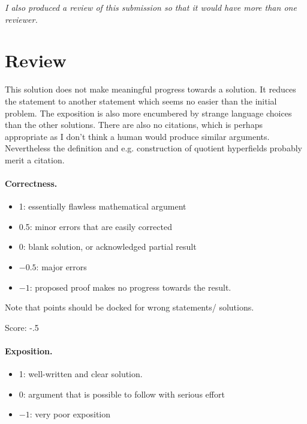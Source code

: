 \documentclass[11pt]{article}
\theoremstyle{definition}
\theoremstyle{remark}
\begin{document}
\maketitle
\noindent\textit{I also produced a review of this submission so that it would have more than one reviewer.}

\section{Review}
{\color{gray} 

This solution does not make meaningful progress towards a solution. It reduces the statement to another statement which seems no easier than the initial problem. The exposition is also more encumbered by strange language choices than the other solutions. There are also no citations, which is perhaps appropriate as I don't think a human would produce similar arguments. Nevertheless the definition and e.g. construction of quotient hyperfields probably merit a citation.}

\paragraph{Correctness.}
\begin{itemize}
	\item  1: essentially flawless mathematical argument
	\item  0.5: minor errors that are easily corrected
	\item  0: blank solution, or acknowledged partial result
	\item  $-0.5$: major errors
	\item  $-1$: proposed proof makes no progress towards the result.
\end{itemize}
Note that points should be docked for wrong statements/ solutions.

\noindent Score: -.5

\paragraph{Exposition.}
\begin{itemize}
	\item  1: well-written and clear solution.
	\item  0: argument that is possible to follow with serious effort
	\item  $-1$: very poor exposition
\end{itemize}
\end{document}
